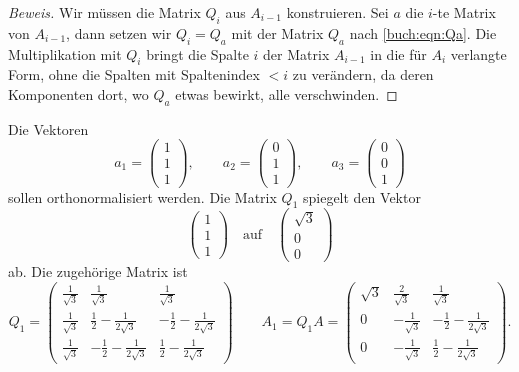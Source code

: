 \begin{proof}[Beweis]
Wir müssen die Matrix $Q_i$ aus $A_{i-1}$ konstruieren.
Sei $a$ die $i$-te Matrix von $A_{i-1}$, dann setzen wir
$Q_i=Q_{a}$ mit der Matrix $Q_a$ nach \eqref{buch:eqn:Qa}.
Die Multiplikation mit $Q_i$ bringt die Spalte $i$ der Matrix 
$A_{i-1}$ in die für $A_{i}$ verlangte Form, ohne die 
Spalten mit Spaltenindex $<i$ zu verändern, da deren Komponenten dort,
wo $Q_a$ etwas bewirkt, alle verschwinden.
\end{proof}

\begin{beispiel}
Die Vektoren
\[
a_1 = \begin{pmatrix}1\\1\\1\end{pmatrix},
\qquad
a_2 = \begin{pmatrix}0\\1\\1\end{pmatrix},
\qquad
a_3 = \begin{pmatrix}0\\0\\1\end{pmatrix}
\]
sollen orthonormalisiert werden.
Die Matrix $Q_1$ spiegelt den Vektor 
\[
\begin{pmatrix}
1\\1\\1
\end{pmatrix}
\quad\text{auf}\quad
\begin{pmatrix}\sqrt{3}\\0\\0\end{pmatrix}
\]
ab.
Die zugehörige Matrix ist
\[
Q_1
=
\begin{pmatrix}
\frac{1}{\sqrt{3}} & \frac{1}{\sqrt{3}}          & \frac{1}{\sqrt{3}} \\
\frac{1}{\sqrt{3}} & \frac12-\frac{1}{2\sqrt{3}} & -\frac12-\frac{1}{2\sqrt{3}}\\
\frac{1}{\sqrt{3}} & -\frac12-\frac{1}{2\sqrt{3}}&\frac12-\frac1{2\sqrt{3}}
\end{pmatrix}
\qquad
A_1
=
Q_1A
=
\begin{pmatrix}
\sqrt{3} &  \frac{2}{\sqrt{3}} & \frac{1}{\sqrt{3}} \\
  0      & -\frac{1}{\sqrt{3}} & -\frac12-\frac{1}{2\sqrt{3}} \\
  0      & -\frac{1}{\sqrt{3}} & \frac12-\frac{1}{2\sqrt{3}}
\end{pmatrix}.
\]
\end{beispiel}

